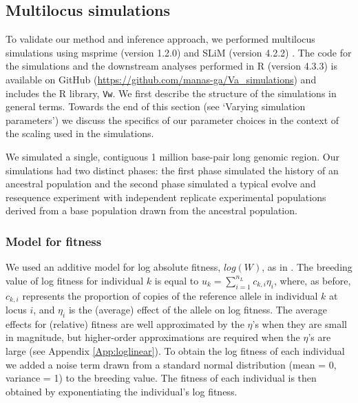 \documentclass[12pt]{article}
\begin{document}
\begin{bibunit}
\subsection*{Multilocus simulations}
To validate our method and inference approach, we performed multilocus simulations using msprime (version 1.2.0) \citep{kelleher2016efficient} and SLiM (version 4.2.2) \citep{haller2023slim}. The code for the simulations and the downstream analyses performed in R (version 4.3.3) is available on GitHub (\url{https://github.com/manas-ga/Va_simulations}) and includes the R library, \texttt{Vw}. We first describe the structure of the simulations in general terms. Towards the end of this section (see `Varying simulation parameters') we discuss the specifics of our parameter choices in the context of the scaling used in the simulations. 

We simulated a single, contiguous 1 million base-pair long genomic region. Our simulations had two distinct phases: the first phase simulated the history of an ancestral population and the second phase simulated a typical evolve and resequence experiment with independent replicate experimental populations derived from a base population drawn from the ancestral population.  

\subsubsection*{Model for fitness}

We used an additive model for log absolute fitness, $log(W)$, as in \citet{buffalo2019linked}. The breeding value of log fitness for individual $k$ is equal to $u_k = \sum_{i=1}^{n_L}{c_{k,i}}{\eta_i}$, where, as before, ${c_{k,i}}$ represents the proportion of copies of the reference allele in individual $k$ at locus $i$, and $\eta_i$ is the (average) effect of the allele on log fitness.  The average effects for (relative) fitness are well approximated by the $\eta$'s when they are small in magnitude, but higher-order approximations are required when the $\eta$'s are large (see Appendix \ref{App:loglinear}).  To obtain the log fitness of each individual we added a noise term drawn from a standard normal distribution (mean = 0, variance = 1) to the breeding value.  The fitness of each individual is then obtained by exponentiating the individual's log fitness.  


\end{bibunit}
\end{document}
